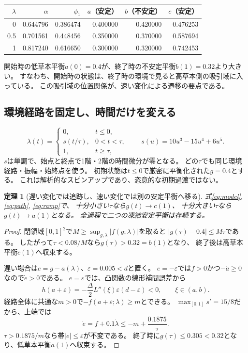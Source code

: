 \documentclass[a4paper,11pt]{ltjsarticle}
\newtheorem{theorem}[proposition]{定理}
\begin{document}
\begin{center}
\begin{tabular}{rrrrrr}
\toprule
$\lambda$&$\alpha$&$\phi_1$&$a$（安定）&$b$（不安定）&$c$（安定）\\\midrule
0&0.644796&0.386474&0.400000&0.420000&0.476253\\
0.5&0.701561&0.448456&0.350000&0.370000&0.587694\\
1&0.817240&0.616650&0.300000&0.320000&0.742453\\
\bottomrule
\end{tabular}
\end{center}
開始時の低草本平衡$a(0)=0.4$が、終了時の不安定平衡$b(1)=0.32$より大きい。
すなわち、開始時の状態は、終了時の環境で見ると高草本側の吸引域に入っている。
この吸引域の位置関係が、速い変化による遷移の要点である。

\subsection{環境経路を固定し、時間だけを変える}
\begin{equation}
 \lambda(t)=
 \begin{cases}
 0,&t\le0,\\
 s(t/\tau),&0<t<\tau,\\
 1,&t\ge\tau,
 \end{cases}
 \qquad s(u)=10u^3-15u^4+6u^5.
 \label{eq:ramp}
\end{equation}
$s$は単調で、始点と終点で1階・2階の時間微分が零となる。
どの$\tau$でも同じ環境経路・振幅・始終点を使う。
初期状態は$t\le0$で厳密に平衡化された$g=0.4$とする。
これは解析的なスピンアップであり、恣意的な初期過渡ではない。

\begin{theorem}[遅い変化では追跡し、速い変化では別の安定平衡へ移る]
式\eqref{eq:model}, \eqref{eq:path}, \eqref{eq:ramp}で、
十分小さい$\tau$なら$g(t)\to c(1)$、
十分大きい$\tau$なら$g(t)\to a(1)$となる。
全過程で二つの凍結安定平衡は存続する。
\end{theorem}
\begin{proof}
閉領域$[0,1]^2$で$M\ge\sup_{g,\lambda}|f(g;\lambda)|$を取ると
$|g(\tau)-0.4|\le M\tau$である。
したがって$\tau<0.08/M$なら$g(\tau)>0.32=b(1)$となり、
終了後は高草本平衡$c(1)$へ収束する。

遅い場合は$e=g-a(\lambda)$、$\varepsilon=0.005<d$と置く。
$e=-\varepsilon$では$f>0$かつ$-\dot a\ge0$なので$\dot e>0$である。
$e=\varepsilon$では、凸関数の線形補間誤差から
\[
 h(a+\varepsilon)
 =-\frac{\Delta}2 L''(\xi)\varepsilon(d-\varepsilon)<0,\qquad \xi\in(a,b).
\]
経路全体に共通な$m>0$で$-f(a+\varepsilon;\lambda)\ge m$とできる。
$\max_{[0,1]}s'=15/8$だから、上端では
\[
 \dot e=f+0.1\dot\lambda\le -m+\frac{0.1875}{\tau}.
\]
$\tau>0.1875/m$なら帯$|e|\le\varepsilon$が不変である。
終了時に$g(\tau)\le0.305<0.32$となり、低草本平衡$a(1)$へ収束する。
\end{proof}
\end{document}
